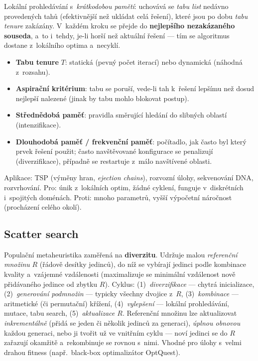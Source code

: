 \documentclass[11pt,a4paper]{article}
\theoremstyle{definition}
\begin{document}
\begin{defbox}
Lokální prohledávání s~\emph{krátkodobou pamětí}: uchovává se \emph{tabu list}
nedávno provedených tahů (efektivnější než ukládat celá řešení), které jsou
po dobu \emph{tabu tenure} zakázány. V~každém kroku se přejde do
\textbf{nejlepšího nezakázaného souseda}, a~to i~tehdy, je-li horší než
aktuální řešení --- tím se algoritmus dostane z~lokálního optima a~necyklí.
\end{defbox}

\begin{itemize}
\item \textbf{Tabu tenure} $T$: statická (pevný počet iterací) nebo dynamická
  (náhodná z~rozsahu).
\item \textbf{Aspirační kritérium}: tabu se poruší, vede-li tah k~řešení
  lepšímu než dosud nejlepší nalezené (jinak by tabu mohlo blokovat postup).
\item \textbf{Střednědobá paměť}: pravidla směrující hledání do slibných
  oblastí (intenzifikace).
\item \textbf{Dlouhodobá paměť / frekvenční paměť}: počítadlo, jak často byl
  který prvek řešení použit; často navštěvované konfigurace se penalizují
  (diverzifikace), případně se restartuje z~málo navštívené oblasti.
\end{itemize}
Aplikace: TSP (výměny hran, \emph{ejection chains}), rozvozní úlohy,
sekvenování DNA, rozvrhování. Pro: únik z~lokálních optim, žádné cyklení,
funguje v~diskrétních i~spojitých doménách. Proti: mnoho parametrů, vyšší
výpočetní náročnost (procházení celého okolí).

\subsection{Scatter search}

Populační metaheuristika zaměřená na \textbf{diverzitu}. Udržuje malou
\emph{referenční množinu} $R$ (řádově desítky jedinců), do níž se vybírají
jedinci podle kombinace kvality a~vzájemné vzdálenosti (maximalizuje se
minimální vzdálenost nově přidávaného jedince od zbytku $R$).
Cyklus: (1)~\emph{diverzifikace} --- chytrá inicializace,
(2)~\emph{generování podmnožin} --- typicky všechny dvojice z~$R$,
(3)~\emph{kombinace} --- aritmetické (či permutační) křížení,
(4)~\emph{vylepšení} --- lokální prohledávání, mutace, tabu search,
(5)~\emph{aktualizace $R$}. Referenční množinu lze aktualizovat
\emph{inkrementálně} (přidá se jeden či několik jedinců za generaci),
\emph{úplnou obnovou} každou generaci, nebo ji tvořit už ve vnitřním cyklu ---
noví jedinci se do $R$ zařazují okamžitě a~rekombinuje se rovnou s~nimi.
Vhodné pro úlohy s~velmi drahou fitness (např.\ black-box optimalizátor
OptQuest).
\end{document}

